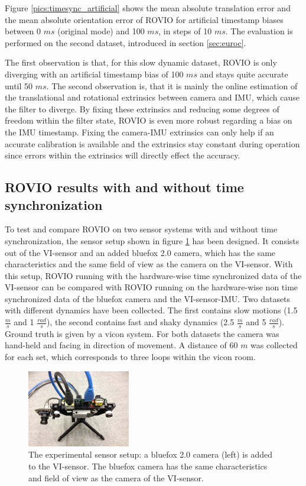 Figure \ref{pics:timesync_artificial} shows the mean absolute translation error and the mean absolute orientation error of ROVIO for artificial timestamp biases between 0 $ms$ (original mode) and 100 $ms$, in steps of 10 $ms$. The evaluation is performed on the second dataset, introduced in section \ref{sec:euroc}. 

The first observation is that, for this slow dynamic dataset, ROVIO is only diverging with an artificial timestamp bias of 100 $ms$ and stays quite accurate until 50 $ms$. The second observation is, that it is mainly the online estimation of the translational and rotational extrinsics between camera and IMU, which cause the filter to diverge. By fixing these extrinsics and reducing some degrees of freedom within the filter state, ROVIO is even more robust regarding a bias on the IMU timestamp. Fixing the camera-IMU extrinsics can only help if an accurate calibration is available and the extrinsics stay constant during operation since errors within the extrinsics will directly effect the accuracy.



\subsection{ROVIO results with and without time synchronization}
\label{sec:timesync_real}

To test and compare ROVIO on two sensor systems with and without time synchronization, the sensor setup shown in figure \ref{pics:vi_bluefox} has been designed. It consists out of the VI-sensor and an added bluefox 2.0 camera, which has the same characteristics and the same field of view as the camera on the VI-sensor. With this setup, ROVIO running with the hardware-wise time synchronized data of the VI-sensor can be compared with ROVIO running on the hardware-wise non time synchronized data of the bluefox camera and the VI-sensor-IMU. Two datasets with different dynamics have been collected. The first contains slow motions (1.5 $\frac{m}{s}$ and 1 $\frac{rad}{s}$), the second contains fast and shaky dynamics (2.5 $\frac{m}{s}$ and 5 $\frac{rad}{s}$). Ground truth is given by a vicon system. For both datasets the camera was hand-held and facing in direction of movement. A distance of 60 $m$ was collected for each set, which corresponds to three loops within the vicon room. \\

\begin{figure}[h]
   \centering
   \includegraphics[width=0.4\textwidth]{images/vi_bluefox.JPG}
   \caption{The experimental sensor setup: a bluefox 2.0 camera (left) is added to the VI-sensor. The bluefox camera has the same characteristics and field of view as the camera of the VI-sensor.}
   \label{pics:vi_bluefox}
\end{figure}


